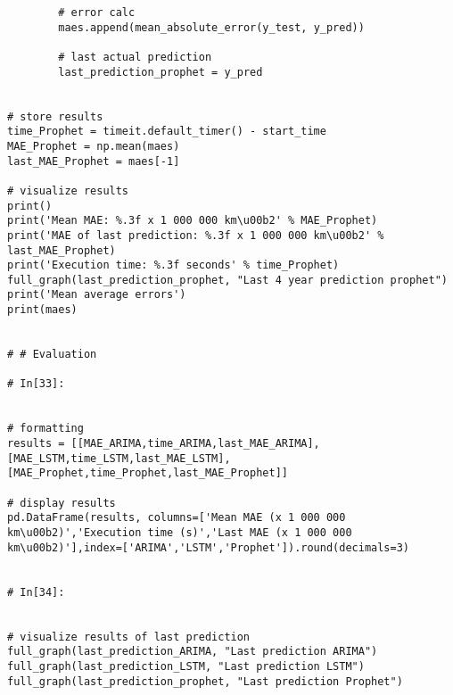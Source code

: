 \begin{verbatim}
        # error calc
        maes.append(mean_absolute_error(y_test, y_pred))

        # last actual prediction 
        last_prediction_prophet = y_pred


# store results
time_Prophet = timeit.default_timer() - start_time
MAE_Prophet = np.mean(maes)
last_MAE_Prophet = maes[-1]

# visualize results
print()
print('Mean MAE: %.3f x 1 000 000 km\u00b2' % MAE_Prophet)
print('MAE of last prediction: %.3f x 1 000 000 km\u00b2' % last_MAE_Prophet)
print('Execution time: %.3f seconds' % time_Prophet)
full_graph(last_prediction_prophet, "Last 4 year prediction prophet")
print('Mean average errors')
print(maes)


# # Evaluation

# In[33]:


# formatting
results = [[MAE_ARIMA,time_ARIMA,last_MAE_ARIMA],[MAE_LSTM,time_LSTM,last_MAE_LSTM],[MAE_Prophet,time_Prophet,last_MAE_Prophet]]

# display results
pd.DataFrame(results, columns=['Mean MAE (x 1 000 000 km\u00b2)','Execution time (s)','Last MAE (x 1 000 000 km\u00b2)'],index=['ARIMA','LSTM','Prophet']).round(decimals=3)


# In[34]:


# visualize results of last prediction
full_graph(last_prediction_ARIMA, "Last prediction ARIMA")
full_graph(last_prediction_LSTM, "Last prediction LSTM")
full_graph(last_prediction_prophet, "Last prediction Prophet")



\end{verbatim}


